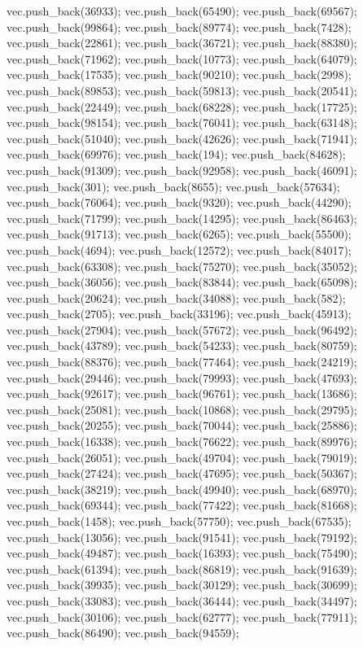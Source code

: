 vec.push_back(36933);
vec.push_back(65490);
vec.push_back(69567);
vec.push_back(99864);
vec.push_back(89774);
vec.push_back(7428);
vec.push_back(22861);
vec.push_back(36721);
vec.push_back(88380);
vec.push_back(71962);
vec.push_back(10773);
vec.push_back(64079);
vec.push_back(17535);
vec.push_back(90210);
vec.push_back(2998);
vec.push_back(89853);
vec.push_back(59813);
vec.push_back(20541);
vec.push_back(22449);
vec.push_back(68228);
vec.push_back(17725);
vec.push_back(98154);
vec.push_back(76041);
vec.push_back(63148);
vec.push_back(51040);
vec.push_back(42626);
vec.push_back(71941);
vec.push_back(69976);
vec.push_back(194);
vec.push_back(84628);
vec.push_back(91309);
vec.push_back(92958);
vec.push_back(46091);
vec.push_back(301);
vec.push_back(8655);
vec.push_back(57634);
vec.push_back(76064);
vec.push_back(9320);
vec.push_back(44290);
vec.push_back(71799);
vec.push_back(14295);
vec.push_back(86463);
vec.push_back(91713);
vec.push_back(6265);
vec.push_back(55500);
vec.push_back(4694);
vec.push_back(12572);
vec.push_back(84017);
vec.push_back(63308);
vec.push_back(75270);
vec.push_back(35052);
vec.push_back(36056);
vec.push_back(83844);
vec.push_back(65098);
vec.push_back(20624);
vec.push_back(34088);
vec.push_back(582);
vec.push_back(2705);
vec.push_back(33196);
vec.push_back(45913);
vec.push_back(27904);
vec.push_back(57672);
vec.push_back(96492);
vec.push_back(43789);
vec.push_back(54233);
vec.push_back(80759);
vec.push_back(88376);
vec.push_back(77464);
vec.push_back(24219);
vec.push_back(29446);
vec.push_back(79993);
vec.push_back(47693);
vec.push_back(92617);
vec.push_back(96761);
vec.push_back(13686);
vec.push_back(25081);
vec.push_back(10868);
vec.push_back(29795);
vec.push_back(20255);
vec.push_back(70044);
vec.push_back(25886);
vec.push_back(16338);
vec.push_back(76622);
vec.push_back(89976);
vec.push_back(26051);
vec.push_back(49704);
vec.push_back(79019);
vec.push_back(27424);
vec.push_back(47695);
vec.push_back(50367);
vec.push_back(38219);
vec.push_back(49940);
vec.push_back(68970);
vec.push_back(69344);
vec.push_back(77422);
vec.push_back(81668);
vec.push_back(1458);
vec.push_back(57750);
vec.push_back(67535);
vec.push_back(13056);
vec.push_back(91541);
vec.push_back(79192);
vec.push_back(49487);
vec.push_back(16393);
vec.push_back(75490);
vec.push_back(61394);
vec.push_back(86819);
vec.push_back(91639);
vec.push_back(39935);
vec.push_back(30129);
vec.push_back(30699);
vec.push_back(33083);
vec.push_back(36444);
vec.push_back(34497);
vec.push_back(30106);
vec.push_back(62777);
vec.push_back(77911);
vec.push_back(86490);
vec.push_back(94559);
